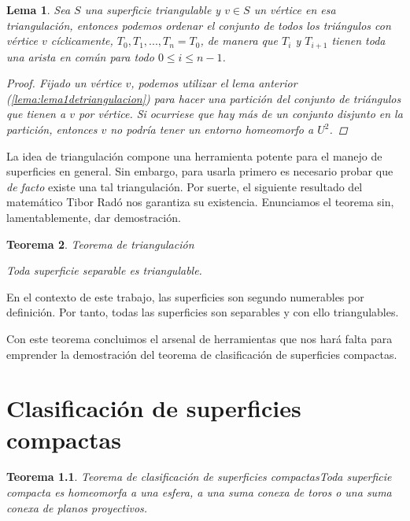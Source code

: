 \documentclass[a4paper,11pt,spanish, twoside, leqno]{tfg-uam}
\newtheorem{teor}{Teorema}[chapter]
\newtheorem{lema}[teor]{Lema}
\theoremstyle{definition}
\begin{document}
\begin{lema}\label{lema:lema2detriangulacion}
Sea  $S$ una superficie triangulable y $v\in S$ un vértice en esa triangulación, entonces podemos ordenar el conjunto de todos los triángulos con vértice $v$ cíclicamente,  $T_0, T_1, ..., T_n = T_0$, de manera que $T_i$ y $T_{i+1}$ tienen toda una arista en común para todo $0\leq i\leq n-1$.

\begin{proof}
Fijado un vértice $v$, podemos utilizar el lema anterior (\ref{lema:lema1detriangulacion}) para hacer una partición del conjunto de triángulos que tienen a $v$ por vértice. Si ocurriese que hay más de un conjunto disjunto en la partición, entonces $v$ no podría tener un entorno homeomorfo a $U^2$.
\end{proof}

\end{lema}

La idea de triangulación compone una herramienta potente para el manejo de superficies en general. Sin embargo, para usarla primero es necesario probar que \textit{de facto} existe una tal triangulación. Por suerte, el siguiente resultado del matemático Tibor Radó nos garantiza su existencia. Enunciamos el teorema sin, lamentablemente, dar demostración.

\begin{teor}{Teorema de triangulación}\label{teor:teoremaDeTriangulacion}	

Toda superficie separable es triangulable.
\end{teor}
En el contexto de este trabajo, las superficies son segundo numerables por definición. Por tanto, todas las superficies son separables y con ello triangulables.

Con este teorema concluimos el arsenal de herramientas que nos hará falta para emprender la demostración del teorema de clasificación de superficies compactas.





\chapter{Clasificación de superficies compactas}

\begin{teor}{Teorema de clasificación de superficies compactas}\label{teor:teoremadeclasificacion}	
Toda superficie compacta es homeomorfa a una esfera, a una suma conexa de toros o una suma conexa de planos proyectivos.
\end{teor}
\end{document}
